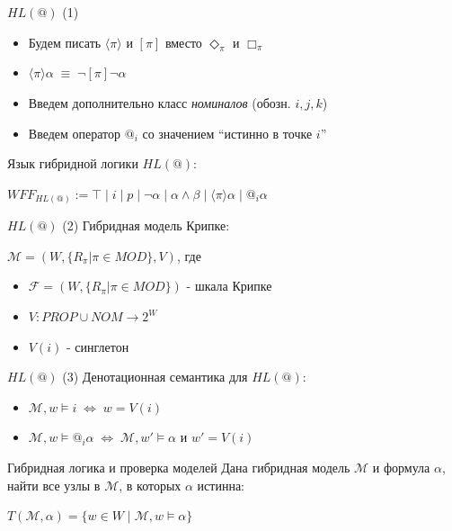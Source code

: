 \documentclass{beamer}
\begin{document}
\begin{frame}{$HL(@)$ (1)}
\begin{itemize}
	\item Будем писать $\langle \pi \rangle$ и $[\pi]$ вместо $\Diamond_\pi$ и $\Box_\pi$
	\item $\langle \pi \rangle \alpha \; \equiv \; \neg [\pi] \neg \alpha$
	\item Введем дополнительно класс \textit{номиналов} (обозн. $i, j, k$)
	\item Введем оператор $@_i$ со значением ``истинно в точке $i$''
\end{itemize}
\bigskip
Язык гибридной логики $HL(@)$:\\
\begin{center}
$WFF_{HL(@)} := \top \; \vert \; i \; \vert \; p \; \vert \; \neg \alpha \; | \; \alpha \wedge \beta \; \vert \; \langle \pi \rangle \alpha \; \vert \; @_i \alpha$
\end{center}
\end{frame}

\begin{frame}{$HL(@)$ (2)}
Гибридная модель Крипке:\\
\bigskip
\begin{center}
$\mathcal{M} = (W, \{R_\pi \vert \pi \in MOD\}, V)$, где\\
\bigskip
\begin{itemize}
	\item $\mathcal{F} = (W, \{R_\pi \vert \pi \in MOD\})$ - шкала Крипке
	\item $V : PROP \cup NOM \to 2^W$
	\item $V(i)$ - синглетон
\end{itemize}
\end{center}
\end{frame}

\begin{frame}{$HL(@)$ (3)}
Денотационная семантика для $HL(@)$:\\
\bigskip
\begin{itemize}
	\item $\mathcal{M}, w \models i \; \Leftrightarrow \; w = V(i)$
	\item $\mathcal{M}, w \models @_i \alpha \; \Leftrightarrow \; \mathcal{M}, w' \models \alpha$ и $w' = V(i)$
\end{itemize}
\end{frame}


\begin{frame}{Гибридная логика и проверка моделей}
Дана гибридная модель $\mathcal{M}$ и формула $\alpha$, найти все узлы в $\mathcal{M}$, в которых $\alpha$ истинна:
\bigskip
\begin{center}
    $T(\mathcal{M}, \alpha) = \{ w \in W \; | \; \mathcal{M}, w \models \alpha \}$
\end{center}
\end{frame}
\end{document}
